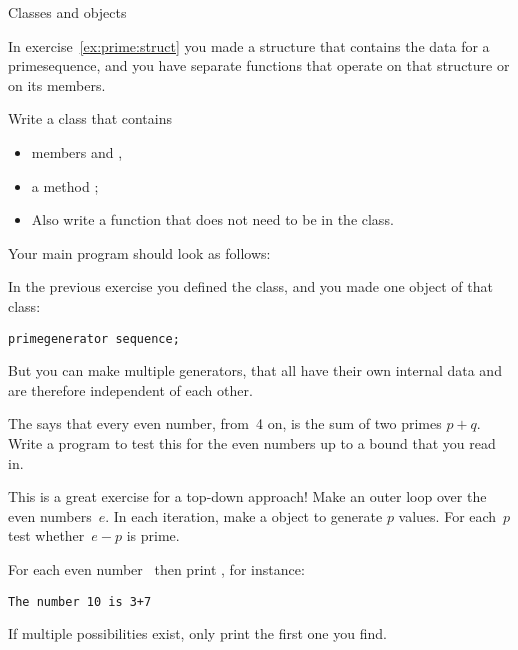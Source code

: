  {Classes and objects}

\prerequisite{\ref{sec:object}}

In exercise~\ref{ex:prime:struct} you made a structure that contains
the data for a primesequence, and you have separate functions that
operate on that structure or on its members.

\begin{exercise}
  \label{ex:prime:sequence}
  Write a class  that contains 
  \begin{itemize}
  \item members   and
    ,
  \item a method ;
  \item Also write a function  that does not need to be
    in the class.
  \end{itemize}

  Your main program should look as follows:
\end{exercise}

In the previous exercise you defined the  class, and
you made one object of that class:
\begin{verbatim}
primegenerator sequence;
\end{verbatim}
But you can make multiple generators, that all have their own internal
data and are therefore independent of each other.

\begin{exercise}
  \label{ex:goldbach:conj}
  The  says that every even number,
  from~4 on, is the sum of two primes $p+q$. Write a program to test this
  for the even numbers up to a bound that you read in.

  This is a great exercise for a top-down approach!
  Make an outer loop over the even numbers~$e$. In each iteration,
  make a  object to generate $p$ values.
  For each~$p$ test whether~$e-p$ is prime.

  For each even number~ then print , for instance:
  \begin{verbatim}
The number 10 is 3+7
  \end{verbatim}
  If multiple possibilities exist, only print the first one you find.
\end{exercise}

